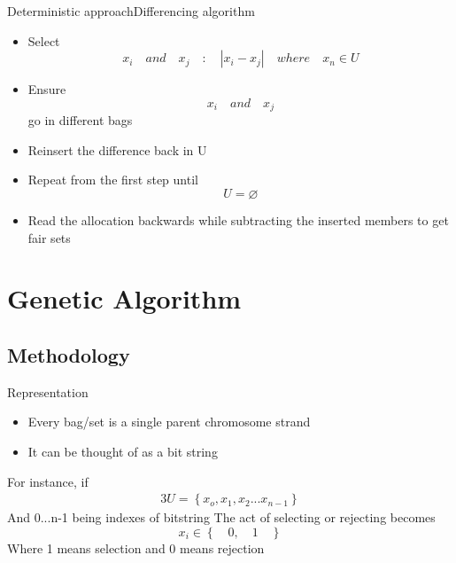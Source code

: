 \documentclass{beamer}
\begin{document}
\begin{frame}{Deterministic approach}{Differencing algorithm}
  \begin{centering}
    \begin{itemize}
    \item Select $$x_i\quad and\quad x_j\quad :\quad | x_i - x_j |\quad where\quad  x_n \in U$$
      \pause
    \item Ensure $$x_i\quad and\quad x_j$$ go in different bags
      \pause
    \item Reinsert the difference back in U
      \pause
    \item Repeat from the first step until $$U = \varnothing$$
      \pause
    \item Read the allocation backwards while subtracting the inserted members to get fair sets
    \end{itemize}
    \pause
  \end{centering}
\end{frame}

\section{Genetic Algorithm}

\subsection{Methodology}

\begin{frame}{Representation}
  \begin{itemize}
  \item Every bag/set is a single parent chromosome strand
    \pause
  \item It can be thought of as a bit string
  \end{itemize}
  \pause
  For instance, if
  \begin{alignat}{3}
    U = \left \{ x_o, x_1, x_2 ... x_{n-1} \right \} 
  \end{alignat}
  And 0...n-1 being indexes of bitstring
  The act of selecting or rejecting becomes $$ x_i \in \left \{\quad 0,\quad 1\quad\right \}$$
  Where 1 means selection and 0 means rejection
\end{frame}
\end{document}
